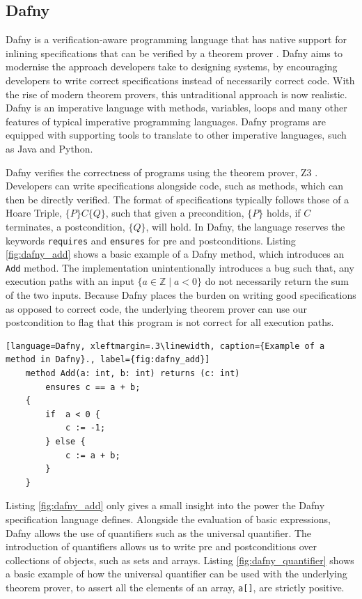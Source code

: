 \subsection[]{Dafny}
Dafny is a verification-aware programming language that has native support for inlining specifications that can be verified by a theorem prover \cite{dafny_paper}. Dafny aims to modernise the approach developers take to designing systems, by encouraging developers to write correct specifications instead of necessarily correct code. With the rise of modern theorem provers, this untraditional approach is now realistic. Dafny is an imperative language with methods, variables, loops and many other features of typical imperative programming languages. Dafny programs are equipped with supporting tools to translate to other imperative languages, such as Java and Python. 
\par
Dafny verifies the correctness of programs using the theorem prover, Z3 \cite{z3}. Developers can write specifications alongside code, such as methods, which can then be directly verified. The format of specifications typically follows those of a Hoare Triple, $\{P\}C\{Q\}$, such that given a precondition, $\{P\}$ holds, if $C$ terminates, a postcondition, $\{Q\}$, will hold. In Dafny, the language reserves the keywords \texttt{requires} and \texttt{ensures} for pre and postconditions. Listing \ref{fig:dafny_add} shows a basic example of a Dafny method, which introduces an \texttt{Add} method. The implementation unintentionally introduces a bug such that, any execution paths with an input $\{ a \in \mathbb{Z} \mid a < 0 \}$ do not necessarily return the sum of the two inputs. Because Dafny places the burden on writing good specifications as opposed to correct code, the underlying theorem prover can use our postcondition to flag that this program is not correct for all execution paths.
\begin{lstlisting}[language=Dafny, xleftmargin=.3\linewidth, caption={Example of a method in Dafny}., label={fig:dafny_add}]
    method Add(a: int, b: int) returns (c: int)
        ensures c == a + b;
    {
        if  a < 0 {
            c := -1;
        } else {
            c := a + b;
        }
    }
\end{lstlisting}
\par
Listing \ref{fig:dafny_add} only gives a small insight into the power the Dafny specification language defines. Alongside the evaluation of basic expressions, Dafny allows the use of quantifiers such as the universal quantifier. The introduction of quantifiers allows us to write pre and postconditions over collections of objects, such as sets and arrays. Listing \ref{fig:dafny_quantifier} shows a basic example of how the universal quantifier can be used with the underlying theorem prover, to assert all the elements of an array, \texttt{a[]}, are strictly positive.
